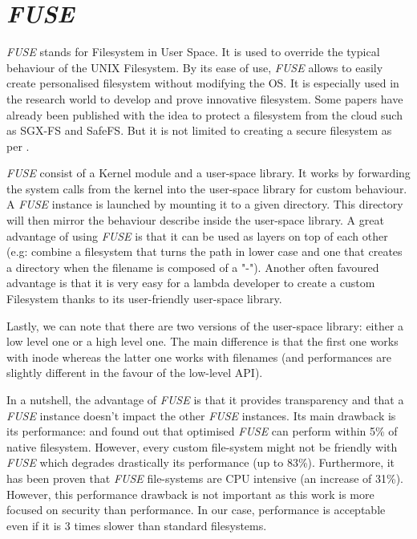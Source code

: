 \documentclass[../main.tex]{subfiles}
\begin{document}
\section{\textit{FUSE}}
\label{section:theoric:fuse}

\par \textit{FUSE} stands for Filesystem in User Space. It is used to override the typical behaviour of the UNIX Filesystem. By its ease of use, \textit{FUSE} allows to easily create personalised filesystem without modifying the OS. It is especially used in the research world to develop and prove innovative filesystem. Some papers have already been published with the idea to protect a filesystem from the cloud such as SGX-FS\cite{8590996} and SafeFS\cite{10.1145/3078468.3078480}. But it is not limited to creating a secure filesystem as per \cite{fuseExamples}.
\par \textit{FUSE} consist of a Kernel module and a user-space library. It works by forwarding the system calls from the kernel into the user-space library for custom behaviour. A \textit{FUSE} instance is launched by mounting it to a given directory. This directory will then mirror the behaviour describe inside the user-space library. A great advantage of using \textit{FUSE} is that it can be used as layers on top of each other (e.g: combine a filesystem that turns the path in lower case and one that creates a directory when the filename is composed of a "-"). Another often favoured advantage is that it is very easy for a lambda developer to create a custom Filesystem thanks to its user-friendly user-space library.
\par Lastly, we can note that there are two versions of the user-space library: either a low level one or a high level one. The main difference is that the first one works with inode whereas the latter one works with filenames (and performances are slightly different in the favour of the low-level API).

\medbreak
\par In a nutshell, the advantage of \textit{FUSE} is that it provides transparency and that a \textit{FUSE} instance doesn't impact the other \textit{FUSE} instances. Its main drawback is its performance: \cite{vangoor2017fuse} and \cite{10.1145/1774088.1774130} found out that optimised \textit{FUSE} can perform within 5\% of native filesystem. However, every custom file-system might not be friendly with \textit{FUSE} which degrades drastically its performance (up to 83\%). Furthermore, it has been proven that \textit{FUSE} file-systems are CPU intensive (an increase of 31\%). However, this performance drawback is not important as this work is more focused on security than performance. In our case, performance is acceptable even if it is 3 times slower than standard filesystems.
\end{document}
